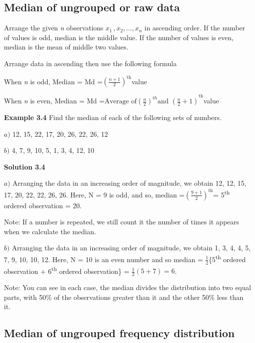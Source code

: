 \documentclass[
]{book}
\begin{document}
\subsection{Median of ungrouped or raw data}\label{median-of-ungrouped-or-raw-data}

Arrange the given \emph{n} observations \(x_{1\ },x_{2},\ldots,x_{n}\) in
ascending order. If the number of values is odd, median is the middle
value. If the number of values is even, median is the mean of middle two
values.

Arrange data in ascending then use the following formula

When \emph{n} is odd, Median = Md
=\(\left( \frac{n + 1}{2} \right)^{\text{th}}\)value

When \emph{n} is even, Median = Md
=\({\text{Average of}\left( \frac{n}{2} \right)^{th}\text{and }\left( \frac{n}{2} + 1 \right)}^{\text{th}}\)value

\textbf{Example 3.4} Find the median of each of the following sets of
numbers.

\(a)\) 12, 15, 22, 17, 20, 26, 22, 26, 12

\(b)\) 4, 7, 9, 10, 5, 1, 3, 4, 12, 10

\textbf{Solution 3.4}

\(a)\) Arranging the data in an increasing order of magnitude, we obtain
12, 12, 15, 17, 20, 22, 22, 26, 26. Here, N = 9 is odd, and so, median
=\(\left( \frac{9 + 1}{2} \right)^{\text{th}}\)= 5\textsuperscript{th} ordered observation
= 20.

Note: If a number is repeated, we still count it the number of times it
appears when we calculate the median.

\(b)\) Arranging the data in an increasing order of magnitude, we obtain
1, 3, 4, 4, 5, 7, 9, 10, 10, 12. Here, N = 10 is an even number and so
median = \(\frac{1}{2}\)\{5\textsuperscript{th} ordered observation + 6\textsuperscript{th} ordered
observation\} = \(\frac{1}{2}\left( 5 + 7 \right) = 6\).

Note: You can see in each case, the median divides the distribution into
two equal parts, with 50\% of the observations greater than it and the
other 50\% less than it.

\subsection{Median of ungrouped frequency distribution}\label{median-of-ungrouped-frequency-distribution}
\end{document}
